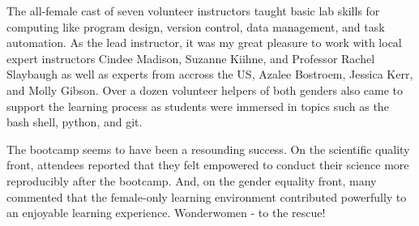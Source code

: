 \documentclass[letterpaper]{article}
\begin{document}
The all-female cast of seven volunteer instructors taught basic lab skills for 
computing like program design, version control, data management, and task 
automation.  As the lead instructor, it was my great pleasure to work with local 
expert instructors Cindee Madison, Suzanne Kiihne, and Professor Rachel 
Slaybaugh as well as experts from accross the US, Azalee Bostroem, Jessica Kerr, 
and Molly Gibson.  Over a dozen volunteer helpers of both genders also came to 
support the learning process as students were immersed in topics such as the 
bash shell, python, and git.  

The bootcamp seems to have been a resounding success. On the scientific quality front, 
attendees reported that they felt empowered to conduct their science more 
reproducibly after the bootcamp. And, on the gender equality front, many 
commented that the female-only learning environment contributed powerfully to an 
enjoyable learning experience. Wonderwomen - to the rescue!



\end{document}
